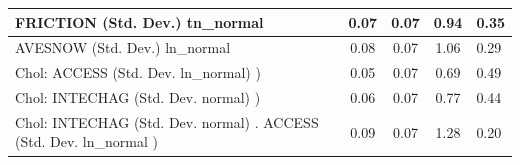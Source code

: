 \begin{table}
\begin{center}
\begin{tabular}{|l|l|c|c|c|l|}
			\hline
			FRICTION (Std. Dev.) tn_normal &  & 0.07 & 0.07 & 0.94 & 0.35 \\
			\hline
			AVESNOW (Std. Dev.) ln_normal &  & 0.08 & 0.07 & 1.06 & 0.29 \\
			\hline
			 Chol: ACCESS (Std. Dev. ln_normal) ) &  & 0.05 & 0.07 & 0.69 & 0.49 \\
			\hline
			 Chol: INTECHAG (Std. Dev. normal) ) &  & 0.06 & 0.07 & 0.77 & 0.44 \\
			\hline
			 Chol: INTECHAG (Std. Dev. normal) . ACCESS (Std. Dev.   ln_normal ) &  & 0.09 & 0.07 & 1.28 & 0.20 \\
			\hline
		\end{tabular}
	\end{center}
\end{table}